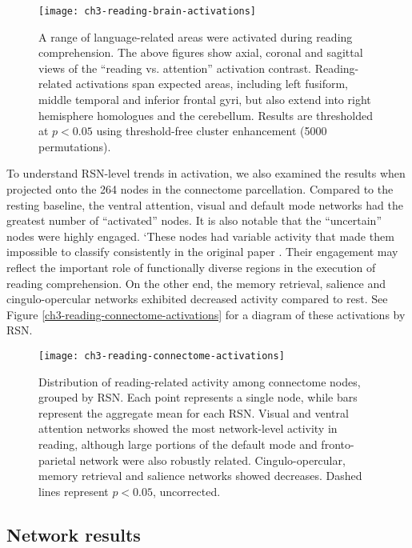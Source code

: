 \begin{figure}[t]
	\centering
	\texttt{[image: ch3-reading-brain-activations]}
    \caption[A range of language-related areas were activated during reading comprehension.]{A range of language-related areas were activated during reading comprehension. The above figures show axial, coronal and sagittal views of the ``reading vs. attention'' activation contrast. Reading-related activations span expected areas, including left fusiform, middle temporal and inferior frontal gyri, but also extend into right hemisphere homologues and the cerebellum. Results are thresholded at $p < 0.05$ using threshold-free cluster enhancement (5000 permutations).}
	\label{fig:ch3-reading-brain-activations}
\end{figure}

To understand RSN-level trends in activation, we also examined the results when projected onto the 264 nodes in the connectome parcellation. Compared to the resting baseline, the ventral attention, visual and default mode networks had the greatest number of ``activated'' nodes. It is also notable that the ``uncertain'' nodes were highly engaged. `These nodes had variable activity that made them impossible to classify consistently in the original paper \citep{Power2011}. Their engagement may reflect the important role of functionally diverse regions in the execution of reading comprehension. On the other end, the memory retrieval, salience and cingulo-opercular networks exhibited decreased activity compared to rest. See Figure \ref{ch3-reading-connectome-activations} for a diagram of these activations by RSN. 

\begin{figure}[t]
	\centering
	\texttt{[image: ch3-reading-connectome-activations]}
    \caption[Distribution of reading-related activity among RSN nodes.]{Distribution of reading-related activity among connectome nodes, grouped by RSN. Each point represents a single node, while bars represent the aggregate mean for each RSN. Visual and ventral attention networks showed the most network-level activity in reading, although large portions of the default mode and fronto-parietal network were also robustly related. Cingulo-opercular, memory retrieval and salience networks showed decreases. Dashed lines represent $p < 0.05$, uncorrected.}
	\label{fig:ch3-reading-connectome-activations}
\end{figure}


\subsection{Network results}


